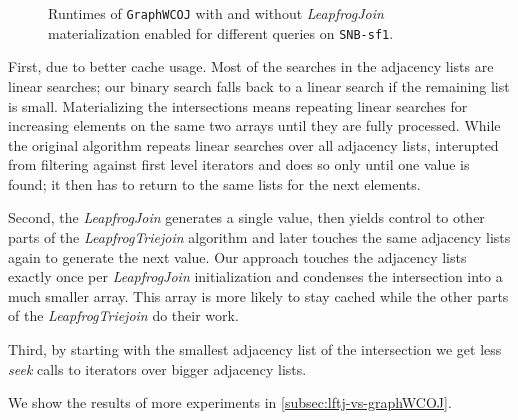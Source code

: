 \begin{figure}[H]
    \centering
    
    \caption{Runtimes of \texttt{GraphWCOJ} with and without \textit{LeapfrogJoin} materialization
    enabled for different queries on \texttt{SNB-sf1}.}
    \label{fig:mat-vs-nomat}
\end{figure}

First, due to better cache usage.
Most of the searches in the adjacency lists are linear searches;
our binary search falls back to a linear search if the remaining list is small.
Materializing the intersections means repeating linear searches for increasing elements on the same
two arrays until they are fully processed.
While the original algorithm repeats linear searches over all adjacency lists, interupted from filtering
against first level iterators and does so only until one value is found;
it then has to return to the same lists for the next elements.

Second, the \textit{LeapfrogJoin} generates a single value, then yields control to other parts
of the \textit{LeapfrogTriejoin} algorithm and later touches the same adjacency lists again to generate the next value.
Our approach touches the adjacency lists exactly once per \textit{LeapfrogJoin} initialization and
condenses the intersection into a much smaller array.
This array is more likely to stay cached while the other parts of the \textit{LeapfrogTriejoin} do their work.

Third, by starting with the smallest adjacency list of the intersection we get less \textit{seek}
calls to iterators over bigger adjacency lists.

We show the results of more experiments in \cref{subsec:lftj-vs-graphWCOJ}.